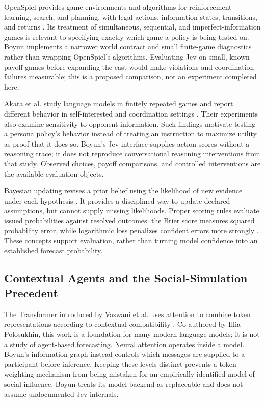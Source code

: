 OpenSpiel provides game environments and algorithms for reinforcement
learning, search, and planning, with legal actions, information states,
transitions, and returns \cite{lanctot2019}. Its treatment of simultaneous,
sequential, and imperfect-information games is relevant to specifying exactly
which game a policy is being tested on. Boyun implements a narrower world
contract and small finite-game diagnostics rather than wrapping OpenSpiel's
algorithms. Evaluating Jev on small, known-payoff games before expanding the
cast would make violations and coordination failures measurable; this is a
proposed comparison, not an experiment completed here.

Akata et al. study language models in finitely repeated games and report
different behavior in self-interested and coordination settings
\cite{akata2025}. Their experiments also examine sensitivity to opponent
information. Such findings motivate testing a persona policy's behavior
instead of treating an instruction to maximize utility as proof that it does
so. Boyun's Jev interface supplies action scores without a reasoning trace;
it does not reproduce conversational reasoning interventions from that study.
Observed choices, payoff comparisons, and controlled interventions are the
available evaluation objects.

Bayesian updating revises a prior belief using the likelihood of new evidence
under each hypothesis \cite{pishronik2014}. It provides a disciplined way to
update declared assumptions, but cannot supply missing likelihoods. Proper
scoring rules evaluate issued probabilities against resolved outcomes: the
Brier score measures squared probability error, while logarithmic loss
penalizes confident errors more strongly \cite{brier1950,gneiting2007}.
These concepts support evaluation, rather than turning model confidence into
an established forecast probability.

\subsection{Contextual Agents and the Social-Simulation Precedent}
The Transformer introduced by Vaswani et al. uses attention to combine token
representations according to contextual compatibility \cite{vaswani2017}.
Co-authored by Illia Polosukhin, this work is a foundation for many modern
language models; it is not a study of agent-based forecasting. Neural
attention operates inside a model. Boyun's information graph instead controls
which messages are supplied to a participant before inference. Keeping these
levels distinct prevents a token-weighting mechanism from being mistaken
for an empirically identified model of social influence. Boyun treats its
model backend as replaceable and does not assume undocumented Jev internals.

